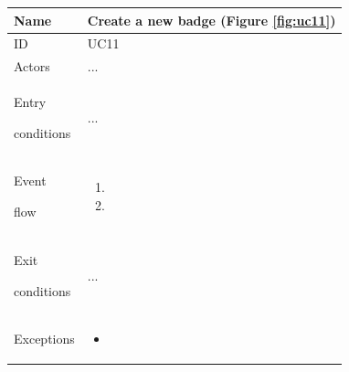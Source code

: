 \begin{center}
    \def\arraystretch{1.5}
    \begin{tabular}{| m{2cm} | m{10cm}|}
        \hline
        Name                  & Create a new badge  (Figure \ref{fig:uc11})                                                                                                               \\ \hline
        ID                    & UC11                                                                                                                            \\ \hline
        Actors                & ... \\ \hline
        Entry \par conditions & ... \\ \hline
        Event \par flow       & \begin{enumerate}
                                    \item 
                                    \item 
                                \end{enumerate} \\ \hline
        Exit \par conditions  & ... \\ \hline
        Exceptions            & \begin{itemize}
                                    \item 
                                \end{itemize} \\ \hline
    \end{tabular}
\end{center}

